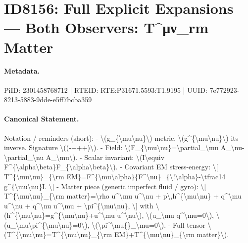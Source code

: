 \section*{ID8156: Full Explicit Expansions — Both Observers: T\textasciicircum{}μν\_rm Matter}
\paragraph{Metadata.}
PiID: 2301458768712 | RTEID: RTE:P31671.5593:T1.9195 | UUID: 7e772923-8213-5883-9dde-e5ff7bcba359

\paragraph{Canonical Statement.}
Notation / reminders (short): - \textbackslash{}(g\_\{\textbackslash{}mu\textbackslash{}nu\}\textbackslash{}) metric, \textbackslash{}(g\textasciicircum{}\{\textbackslash{}mu\textbackslash{}nu\}\textbackslash{}) its inverse. Signature \textbackslash{}((-+++)\textbackslash{}). - Field: \textbackslash{}(F\_\{\textbackslash{}mu\textbackslash{}nu\}=\textbackslash{}partial\_\textbackslash{}mu A\_\textbackslash{}nu-\textbackslash{}partial\_\textbackslash{}nu A\_\textbackslash{}mu\textbackslash{}). - Scalar invariant: \textbackslash{}(I\textbackslash{}equiv F\textasciicircum{}\{\textbackslash{}alpha\textbackslash{}beta\}F\_\{\textbackslash{}alpha\textbackslash{}beta\}\textbackslash{}). - Covariant EM stress-energy: \textbackslash{}[ T\textasciicircum{}\{\textbackslash{}mu\textbackslash{}nu\}\_\{\textbackslash{}rm EM\}=F\textasciicircum{}\{\textbackslash{}mu\textbackslash{}alpha\}\{F\textasciicircum{}\textbackslash{}nu\}\_\{\textbackslash{}!\textbackslash{}alpha\}-\textbackslash{}tfrac14 g\textasciicircum{}\{\textbackslash{}mu\textbackslash{}nu\}I. \textbackslash{}] - Matter piece (generic imperfect fluid / gyro): \textbackslash{}[ T\textasciicircum{}\{\textbackslash{}mu\textbackslash{}nu\}\_\{\textbackslash{}rm matter\}=\textbackslash{}rho u\textasciicircum{}\textbackslash{}mu u\textasciicircum{}\textbackslash{}nu + p\textbackslash{},h\textasciicircum{}\{\textbackslash{}mu\textbackslash{}nu\} + q\textasciicircum{}\textbackslash{}mu u\textasciicircum{}\textbackslash{}nu + q\textasciicircum{}\textbackslash{}nu u\textasciicircum{}\textbackslash{}mu + \textbackslash{}pi\textasciicircum{}\{\textbackslash{}mu\textbackslash{}nu\}, \textbackslash{}] with \textbackslash{}(h\textasciicircum{}\{\textbackslash{}mu\textbackslash{}nu\}=g\textasciicircum{}\{\textbackslash{}mu\textbackslash{}nu\}+u\textasciicircum{}\textbackslash{}mu u\textasciicircum{}\textbackslash{}nu\textbackslash{}), \textbackslash{}(u\_\textbackslash{}mu q\textasciicircum{}\textbackslash{}mu=0\textbackslash{}), \textbackslash{}(u\_\textbackslash{}mu\textbackslash{}pi\textasciicircum{}\{\textbackslash{}mu\textbackslash{}nu\}=0\textbackslash{}), \textbackslash{}(\textbackslash{}pi\textasciicircum{}\textbackslash{}mu\{\}\_\textbackslash{}mu=0\textbackslash{}). - Full tensor \textbackslash{}(T\textasciicircum{}\{\textbackslash{}mu\textbackslash{}nu\}=T\textasciicircum{}\{\textbackslash{}mu\textbackslash{}nu\}\_\{\textbackslash{}rm EM\}+T\textasciicircum{}\{\textbackslash{}mu\textbackslash{}nu\}\_\{\textbackslash{}rm matter\}\textbackslash{}).

